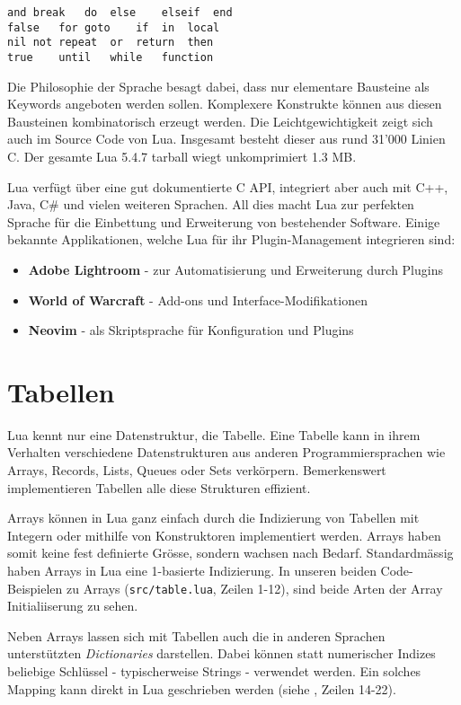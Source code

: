 \documentclass[11pt,a4paper]{article}
\begin{document}
\begin{lstlisting}
and	break	do	else	elseif	end
false	for	goto 	if	in	local
nil	not	repeat	or	return	then
true	until	while	function
\end{lstlisting}

Die Philosophie der Sprache besagt dabei, dass nur elementare Bausteine als Keywords angeboten werden sollen. Komplexere Konstrukte können aus diesen Bausteinen kombinatorisch erzeugt werden. Die Leichtgewichtigkeit zeigt sich auch im Source Code von Lua. Insgesamt besteht dieser aus rund 31’000 Linien C. Der gesamte Lua 5.4.7 tarball wiegt unkomprimiert 1.3 MB.

Lua verfügt über eine gut dokumentierte C API, integriert aber auch mit C++, Java, C\# und vielen weiteren Sprachen. All dies macht Lua zur perfekten Sprache für die Einbettung und Erweiterung von bestehender Software.
Einige bekannte Applikationen, welche Lua für ihr Plugin-Management integrieren sind:

\begin{itemize}
  \item \textbf{Adobe Lightroom} - zur Automatisierung und Erweiterung durch Plugins
  \item \textbf{World of Warcraft} - Add-ons und Interface-Modifikationen
  \item \textbf{Neovim} - als Skriptsprache für Konfiguration und Plugins
\end{itemize}

\section*{Tabellen}

Lua kennt nur eine Datenstruktur, die Tabelle. Eine Tabelle kann in ihrem Verhalten verschiedene Datenstrukturen aus anderen Programmiersprachen wie Arrays, Records, Lists, Queues oder Sets verkörpern.
Bemerkenswert implementieren Tabellen alle diese Strukturen effizient.

Arrays können in Lua ganz einfach durch die Indizierung von Tabellen mit Integern oder mithilfe von Konstruktoren implementiert werden.
Arrays haben somit keine fest definierte Grösse, sondern wachsen nach Bedarf.
Standardmässig haben Arrays in Lua eine 1-basierte Indizierung.
In unseren beiden Code-Beispielen zu Arrays (\texttt{src/table.lua}, Zeilen 1-12), sind beide Arten der Array Initialiiserung zu sehen.

Neben Arrays lassen sich mit Tabellen auch die in anderen Sprachen unterstützten \textit{Dictionaries} darstellen.
Dabei können statt numerischer Indizes beliebige Schlüssel - typischerweise Strings - verwendet werden.
Ein solches Mapping kann direkt in Lua geschrieben werden (siehe , Zeilen 14-22).
\end{document}
